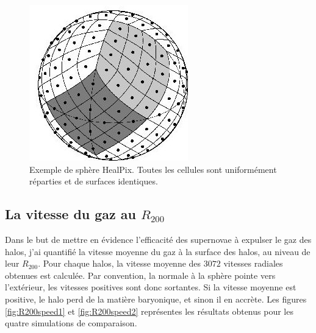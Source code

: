 \begin{figure}
	\centering
    \includegraphics[width=.45\linewidth]{img/03/healpix.jpg} 
    \caption[Sphère HealPix]{Exemple de sphère HealPix. Toutes les cellules sont uniformément réparties et de surfaces identiques.}
 	\label{fig:HealPix}
\end{figure}

\subsection{La vitesse du gaz au $R_{200}$}
\label{sec:snvitesses}

Dans le but de mettre en évidence l'efficacité des supernovae à expulser le gaz des halos, j'ai quantifié la vitesse moyenne du gaz à la surface des halos, au niveau de leur $R_{200}$.
Pour chaque halos, la vitesse moyenne des $3072$ vitesses radiales obtenues est calculée.
Par convention, la normale à la sphère pointe vers l'extérieur, les vitesses positives sont donc sortantes.
Si la vitesse moyenne est positive, le halo perd de la matière baryonique, et sinon il en accrète.
Les figures \ref{fig:R200speed1} et \ref{fig:R200speed2} représentes les résultats obtenus pour les quatre simulations de comparaison.

